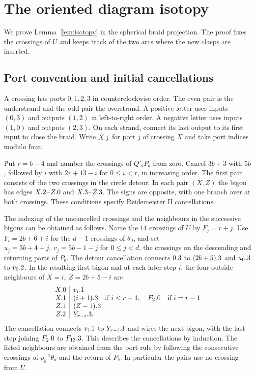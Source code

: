 \section{The oriented diagram isotopy}\label{app:ports}

We prove Lemma~\ref{lem:isotopy} in the spherical braid projection.
The proof fixes the crossings of \(U\) and keeps track of the
two arcs where the new clasps are inserted.

\subsection{Port convention and initial cancellations}

A crossing has ports \(0,1,2,3\) in counterclockwise order.
The even pair is the
understrand and the odd pair the overstrand. A positive letter uses
inputs \((0,3)\) and outputs \((1,2)\) in left-to-right order.
A negative letter uses inputs \((1,0)\) and outputs \((2,3)\).
On each strand, connect its last output to its first input to close
the braid. Write \(X.j\) for port \(j\) of crossing \(X\)
and take port indices modulo four.

Put \(r=b-4\) and number the crossings of \(Q'_bP_b\) from zero.
Cancel \(3b+3\) with \(5b\), followed by \(i\) with \(2r+13-i\)
for \(0\le i<r\), in increasing order. The first pair consists
of the two crossings in the circle detour. In each pair \((X,Z)\)
the bigon has edges \(X.2\)--\(Z.0\) and
\(X.3\)--\(Z.3\). The signs are opposite, with one branch
over at both crossings. These conditions specify Reidemeister II
cancellations.

The indexing of the uncancelled crossings and the neighbours
in the successive bigons can be obtained as follows. Name the
\(14\) crossings of \(U\) by \(F_j=r+j\). Use \(Y_i=2b+6+i\)
for the \(d-1\) crossings of \(\theta_d\), and set
\(u_j=3b+4+j,\ v_j=5b-1-j\) for \(0\le j<d\), the crossings
on the descending and returning parts of \(P_b\). The detour
cancellation connects \(0.3\) to \((2b+5).3\)
and \(u_0.3\) to \(v_0.2\). In the resulting
first bigon and at each later step \(i\), the four outside
neighbours of \(X=i,\ Z=2b+5-i\) are
\[
\begin{array}{c|l}
 X.0&v_i.1\\
 X.1&(i+1).3\quad\text{if }i<r-1,\quad
                 F_2.0\quad\text{if }i=r-1\\
 Z.1&(Z-1).3\\
 Z.2&Y_{r-i}.3 .
\end{array}
\]
The cancellation connects \(v_i.1\) to
\(Y_{r-i}.3\) and wires the next bigon, with the last
step joining \(F_2.0\) to \(F_{13}.3\).
This describes the cancellations by induction. The listed
neighbours are obtained from the port rule by following the
consecutive crossings of \(\rho_b^{-1}\theta_d\) and the return
of \(P_b\). In particular the pairs use no crossing from \(U\).

